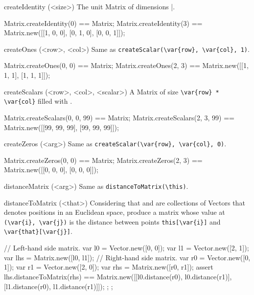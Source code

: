 \begin{urbiscriptapi}
\begin{urbiassert}
\end{urbiassert}

\item[createIdentity](<size>)%
  The unit Matrix of dimensions |.
\begin{urbiassert}
Matrix.createIdentity(0) == Matrix;
Matrix.createIdentity(3) == Matrix.new([[1, 0, 0], [0, 1, 0], [0, 0, 1]]);
\end{urbiassert}

\item[createOnes](<row>, <col>)%
  Same as \lstinline|createScalar(\var{row}, \var{col}, 1)|.
\begin{urbiassert}
Matrix.createOnes(0, 0) == Matrix;
Matrix.createOnes(2, 3) == Matrix.new([[1, 1, 1], [1, 1, 1]]);
\end{urbiassert}

\item[createScalars](<row>, <col>, <scalar>)%
  A Matrix of size \lstinline|\var{row} * \var{col}| filled with
  .
\begin{urbiassert}
Matrix.createScalars(0, 0, 99) == Matrix;
Matrix.createScalars(2, 3, 99) == Matrix.new([[99, 99, 99], [99, 99, 99]]);
\end{urbiassert}

\item[createZeros](<arg>)%
  Same as \lstinline|createScalar(\var{row}, \var{col}, 0)|.
\begin{urbiassert}
Matrix.createZeros(0, 0) == Matrix;
Matrix.createZeros(2, 3) == Matrix.new([[0, 0, 0], [0, 0, 0]]);
\end{urbiassert}

\item[distanceMatrix](<arg>)%
  Same as \lstinline|distanceToMatrix(\this)|.
\begin{urbiassert}

\end{urbiassert}

\item[distanceToMatrix](<that>)%
  Considering that \this and \that are collections of Vectors that denotes
  positions in an Euclidean space, produce a matrix whose value at
  \lstinline|(\var{i}, \var{j})| is the distance between points
  \lstinline|this[\var{i}]| and \lstinline|\var{that}[\var{j}]|.
\begin{urbiscript}
{
  // Left-hand side matrix.
  var l0 = Vector.new([0, 0]);  var l1 = Vector.new([2, 1]);
  var lhs = Matrix.new([l0, l1]);
  // Right-hand side matrix.
  var r0 = Vector.new([0, 1]);  var r1 = Vector.new([2, 0]);
  var rhs = Matrix.new([r0, r1]);
  assert
  {
    lhs.distanceToMatrix(rhs)
      == Matrix.new([[l0.distance(r0), l0.distance(r1)],
                     [l1.distance(r0), l1.distance(r1)]]);
  };
};
\end{urbiscript}


\end{urbiscriptapi}
